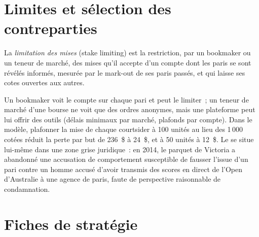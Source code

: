 \section{Limites et sélection des contreparties}

\begin{definition}\label{def:hf:prediction-and-sports-market-making:limiting}
La \emph{limitation des mises} (stake limiting) est la restriction, par un bookmaker ou un teneur de marché, des mises qu'il accepte d'un compte dont les paris se sont révélés informés,
mesurée par le mark-out de ses paris passés, et qui laisse ses cotes ouvertes aux autres.
\end{definition}

Un bookmaker voit le compte sur chaque pari et peut le limiter~; un teneur de marché d'une bourse ne voit que des ordres anonymes, mais une plateforme peut lui offrir des outils
(délais minimaux par marché, plafonds par compte). Dans le modèle, plafonner la mise de chaque courtsider à 100 unités au lieu des 1\,000 cotées réduit la perte
par but de 236~\$ à 24~\$, et à 50 unités à 12~\$. Le  se situe lui-même dans une zone grise juridique~: en 2014, le parquet de Victoria a abandonné une
accusation de comportement susceptible de fausser l'issue d'un pari contre un homme accusé d'avoir transmis des scores en direct de l'Open d'Australie à une agence de paris,
faute de perspective raisonnable de condamnation.

\section{Fiches de stratégie}

